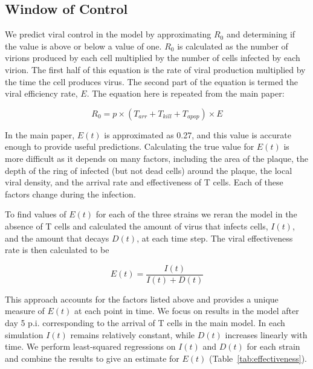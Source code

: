 \documentclass[10pt]{article}
\begin{document}
\subsection{Window of Control}

We predict viral control in the model by approximating $R_0$ and determining if the value is above or below a value of one.  $R_0$ is calculated as the number of virions produced by each cell multiplied by the number of cells infected by each virion.  The first half of this equation is the rate of viral production multiplied by the time the cell produces virus.  The second part of the equation is termed the viral efficiency rate, $E$.  The equation here is repeated from the main paper:

\begin{equation}
R_0 = p \times (T_{arr} + T_{kill} + T_{apop}) \times E
\end{equation}

In the main paper, $E(t)$ is approximated as 0.27, and this value is accurate enough to provide useful predictions.  Calculating the true value for $E(t)$ is more difficult as it depends on many factors, including the area of the plaque, the depth of the ring of infected (but not dead cells) around the plaque, the local viral density, and the arrival rate and effectiveness of T cells.  Each of these factors change during the infection. 

To find values of $E(t)$ for each of the three strains we reran the model in the absence of T cells and calculated the amount of virus that infects cells, $I(t)$, and the amount that decays $D(t)$, at each time step.  The viral effectiveness rate is then calculated to be

\begin{equation}
E(t) = \frac{I(t)}{I(t) + D(t)}
\end{equation}

This approach accounts for the factors listed above and provides a unique measure of $E(t)$ at each point in time.  We focus on results in the model after day 5 p.i. corresponding to the arrival of T cells in the main model.  In each simulation $I(t)$ remains relatively constant, while $D(t)$ increases linearly with time.  We perform least-squared regressions on $I(t)$ and $D(t)$ for each strain and combine the results to give an estimate for $E(t)$ (Table~\ref{tab:effectiveness}).  
\end{document}
